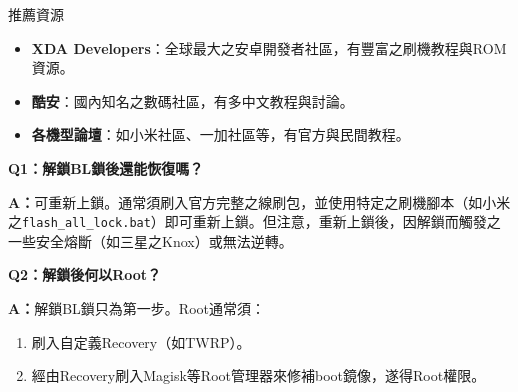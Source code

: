 \begin{tcbinfo}{推薦資源}
\begin{itemize}
  \item \textbf{XDA Developers}：全球最大之安卓開發者社區，有豐富之刷機教程與ROM資源。
  \item \textbf{酷安}：國內知名之數碼社區，有多中文教程與討論。
  \item \textbf{各機型論壇}：如小米社區、一加社區等，有官方與民間教程。
\end{itemize}

\end{tcbinfo}


\textbf{Q1：解鎖BL鎖後還能恢復嗎？}\par

\textbf{A：}可重新上鎖。通常須刷入官方完整之線刷包，並使用特定之刷機腳本（如小米之\texttt{flash\_all\_lock.\allowbreak bat}）即可重新上鎖。但注意，重新上鎖後，因解鎖而觸發之一些安全熔斷（如三星之Knox）或無法逆轉。

\textbf{Q2：解鎖後何以Root？}\par

\textbf{A：}解鎖BL鎖只為第一步。Root通常須：

\begin{enumerate}
  \item 刷入自定義Recovery（如TWRP）。
  \item 經由Recovery刷入Magisk等Root管理器來修補boot鏡像，遂得Root權限。
\end{enumerate}
